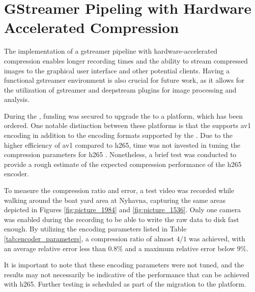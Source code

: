 \section{GStreamer Pipeling with Hardware Accelerated Compression}

The implementation of a \gls{gstreamer} pipeline with hardware-accelerated compression enables longer recording times and the ability to stream compressed images to the graphical user interface and other potential clients.
Having a functional \gls{gstreamer} environment is also crucial for future work, as it allows for the utilization of \gls{gstreamer} and \gls{deepstream} plugins for image processing and analysis.

During the \master, funding was secured to upgrade the \jx to a \jo platform, which has been ordered.
One notable distinction between these platforms is that the \jo supports \gls{av1} encoding in addition to the encoding formats supported by the \jx \cite{karumbunathanNVIDIAJetsonAGX2022}.
Due to the higher efficiency of \gls{av1} compared to \gls{h265}, time was not invested in tuning the compression parameters for \gls{h265} \cite{torresAV1VsHEVC2022}.
Nonetheless, a brief test was conducted to provide a rough estimate of the expected compression performance of the \gls{h265} encoder.

To measure the compression ratio and error, a test video was recorded while walking around the boat yard area at Nyhavna, capturing the same areas depicted in Figures \ref{fig:picture_1984} and \ref{fig:picture_1536}.
Only one camera was enabled during the recording to be able to write the raw data to disk fast enough.
By utilizing the encoding parameters listed in Table \ref{tab:encoder_parameters}, a compression ratio of almost $4/1$ was achieved, with an average relative error less than $0.8\%$ and a maximum relative error below $9\%$.

It is important to note that these encoding parameters were not tuned, and the results may not necessarily be indicative of the performance that can be achieved with \gls{h265}.
Further testing is scheduled as part of the migration to the \jo platform.

